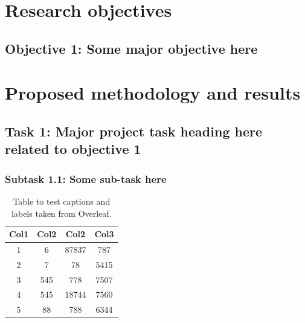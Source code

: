 \section{Research objectives}                   %

\blindtext \cite{knuthwebsite}

\subsection*{Objective 1: Some major objective here}

\blindtext







\section{Proposed methodology and results}      %

\blindtext

\subsection{Task 1: Major project task heading here related to objective 1}

\blindtext


\subsubsection*{Subtask 1.1: Some sub-task here}

\blindtext

\begin{table}[ht]
\centering
\begin{tabular}{c c c c} 
\toprule \toprule
Col1 & Col2 & Col2 & Col3 \\ 
\toprule \toprule
1 & 6 & 87837 & 787 \\ 
2 & 7 & 78 & 5415 \\
3 & 545 & 778 & 7507 \\
4 & 545 & 18744 & 7560 \\
5 & 88 & 788 & 6344 \\ 
\bottomrule
\end{tabular}
\caption{Table to test captions and labels taken from Overleaf.}
\label{table:1}
\end{table}


